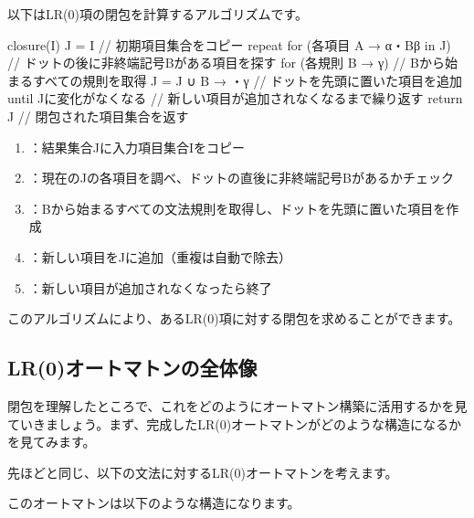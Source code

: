 以下はLR(0)項の閉包を計算するアルゴリズムです。

\begin{codescreen}{}
closure(I) {
    J = I                                   // 初期項目集合をコピー
    repeat {
        for (各項目 A → α・Bβ in J) {    
                                // ドットの後に非終端記号Bがある項目を探す
            for (各規則 B → γ) {        // Bから始まるすべての規則を取得
                J = J ∪ {B → ・γ}      // ドットを先頭に置いた項目を追加
            }
        }
    } until Jに変化がなくなる   // 新しい項目が追加されなくなるまで繰り返す
    return J                              // 閉包された項目集合を返す
}
\end{codescreen}


\begin{enumerate}
\item
  ：結果集合Jに入力項目集合Iをコピー
\item
  ：現在のJの各項目を調べ、ドットの直後に非終端記号Bがあるかチェック
\item
  ：Bから始まるすべての文法規則を取得し、ドットを先頭に置いた項目を作成
\item
  ：新しい項目をJに追加（重複は自動で除去）
\item
  ：新しい項目が追加されなくなったら終了
\end{enumerate}

このアルゴリズムにより、あるLR(0)項に対する閉包を求めることができます。

\subsection{LR(0)オートマトンの全体像}

閉包を理解したところで、これをどのようにオートマトン構築に活用するかを見ていきましょう。まず、完成したLR(0)オートマトンがどのような構造になるかを見てみます。

先ほどと同じ、以下の文法に対するLR(0)オートマトンを考えます。


このオートマトンは以下のような構造になります。

